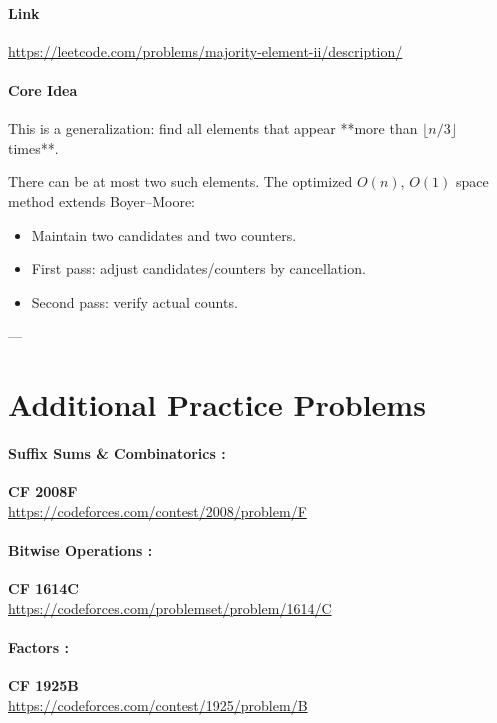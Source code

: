 \documentclass[11pt]{article}
\begin{document}
\paragraph{Link}
\url{https://leetcode.com/problems/majority-element-ii/description/}

\paragraph{Core Idea}

This is a generalization: find all elements that appear **more than $\lfloor n/3 \rfloor$ times**.

There can be at most two such elements.
The optimized $O(n)$, $O(1)$ space method extends Boyer–Moore:

\begin{itemize}
    \item Maintain two candidates and two counters.
    \item First pass: adjust candidates/counters by cancellation.
    \item Second pass: verify actual counts.
\end{itemize}

---

\section{Additional Practice Problems}

\paragraph{Suffix Sums \& Combinatorics :}
\textbf{CF 2008F} \\
\url{https://codeforces.com/contest/2008/problem/F}

\paragraph{Bitwise Operations :}
\textbf{CF 1614C} \\
\url{https://codeforces.com/problemset/problem/1614/C}

\paragraph{Factors :}
\textbf{CF 1925B} \\
\url{https://codeforces.com/contest/1925/problem/B}
\end{document}
